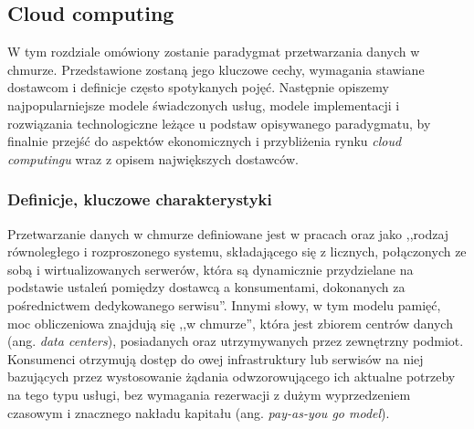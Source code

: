 \documentclass[12pt,a4paper,twoside]{article}
\begin{document}
\clearpage

\subsection{Cloud computing}

W tym rozdziale omówiony zostanie paradygmat przetwarzania danych w chmurze. Przedstawione zostaną jego kluczowe cechy, wymagania stawiane dostawcom i definicje często spotykanych pojęć. Następnie opiszemy najpopularniejsze modele świadczonych usług, modele implementacji i rozwiązania technologiczne leżące u podstaw opisywanego paradygmatu, by finalnie przejść do aspektów ekonomicznych i przybliżenia rynku \textit{cloud computingu} wraz z opisem największych dostawców.

\subsubsection{Definicje, kluczowe charakterystyki}

\noindent
Przetwarzanie danych w chmurze definiowane jest w pracach \citet{buyya2009} oraz \citet{calheiros2010} jako ,,rodzaj równoległego i rozproszonego systemu, składającego się z licznych, połączonych ze sobą i wirtualizowanych serwerów, która są dynamicznie przydzielane na podstawie ustaleń pomiędzy dostawcą a konsumentami, dokonanych za pośrednictwem dedykowanego serwisu''. Innymi słowy, w tym modelu pamięć, moc obliczeniowa znajdują się ,,w chmurze'', która jest zbiorem centrów danych (ang. \textit{data centers}), posiadanych oraz utrzymywanych przez zewnętrzny podmiot. Konsumenci otrzymują dostęp do owej infrastruktury lub serwisów na niej bazujących przez wystosowanie żądania odwzorowującego ich aktualne potrzeby na tego typu usługi, bez wymagania rezerwacji z dużym wyprzedzeniem czasowym i znacznego nakładu kapitału (ang. \textit{pay-as-you go model}).
\end{document}
